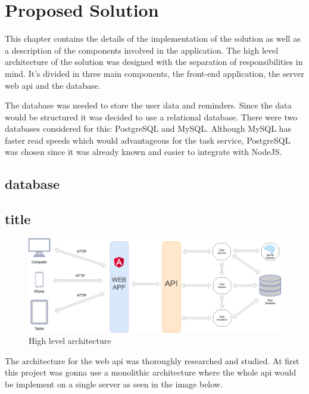 \chapter{Proposed Solution}

	This chapter contains the details of the implementation of the solution as well as a description of the components involved in the application.
	The high level architecture of the solution was designed with the separation of responsibilities in mind. It's divided in three main components, the front-end application, the server web \gls{api} and the database.
	
	The database was needed to store the user data and reminders. 
	Since the data would be structured it was decided to use a relational database.
	There were two databases considered for this: PostgreSQL and MySQL. Although MySQL has faster read speeds \cite{db-speed} which would advantageous for the task service, PostgreSQL was chosen since it was already known and easier to integrate with NodeJS.
	
	\section{database}
	
	
	\section{title}
	
	\begin{figure}[h!]
		\centering
		\includegraphics[width=\linewidth]{./images/abstract_architecture}
		\caption{High level architecture}
	\end{figure}
	
	The architecture for the web \gls{api} was thoroughly researched and studied. At first this project was gonna use a monolithic architecture \cite{monolith} where the whole \gls{api} would be implement on a single server as seen in the image below.

